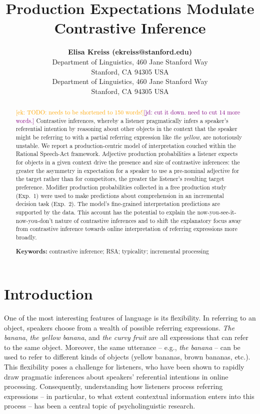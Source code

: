 \documentclass[10pt,letterpaper]{article}
\title{Production Expectations Modulate Contrastive Inference}
\author{{\large \bf Elisa Kreiss (ekreiss@stanford.edu)} \\
  Department of Linguistics, 460 Jane Stanford Way \\
  Stanford, CA 94305 USA
  \AND {\large \bf Judith Degen (jdegen@stanford.edu)} \\
  Department of Linguistics, 460 Jane Stanford Way \\
  Stanford, CA 94305 USA}
\newcommand{\ek}[1]{\textcolor{Orange}{[ek: #1]}}
\newcommand{\jd}[1]{\textcolor{Purple}{[jd: #1]}}
\begin{document}
\maketitle

\begin{abstract}
\ek{TODO: needs to be shortened to 150 words!}\jd{cut it down. need to cut 14 more words.}
Contrastive inferences, whereby a listener pragmatically infers a speaker's  referential intention by reasoning about other objects in the context that the speaker might be referring to with a partial referring expression like \emph{the yellow}, are notoriously unstable. We report a production-centric model of interpretation couched within the Rational Speech-Act framework. Adjective production probabilities a listener expects for objects in a given context drive the presence and size of contrastive inferences: the greater the asymmetry in expectation for a speaker to use a pre-nominal adjective for the target rather than for competitors, the greater the listener's resulting  target preference. Modifier production probabilities collected in a free production study (Exp.~1) were used to make predictions about comprehension in an incremental decision task (Exp.~2). The model's fine-grained interpretation predictions are supported by the data. This account has the potential to explain the now-you-see-it-now-you-don't nature of contrastive inferences and to shift the explanatory focus away from contrastive inference towards online interpretation of referring expressions more broadly.


\textbf{Keywords:} 
contrastive inference; RSA; typicality; incremental processing
\end{abstract}

\section{Introduction}

One of the most interesting features of language is its flexibility. In referring to an object, speakers choose from a wealth of possible referring expressions. \textit{The banana}, \textit{the yellow banana}, and \textit{the curvy fruit}  are all expressions that can refer to the same object. Moreover, the same utterance -- e.g., \textit{the banana} -- can be used to refer to different kinds of objects (yellow bananas, brown bananas, etc.). This flexibility poses a challenge for listeners, who have been shown to rapidly draw pragmatic inferences about speakers' referential intentions in online processing. Consequently, understanding how listeners process referring expressions -- in particular, to what extent contextual information enters into this process -- has been a central topic of psycholinguistic research.
\end{document}
